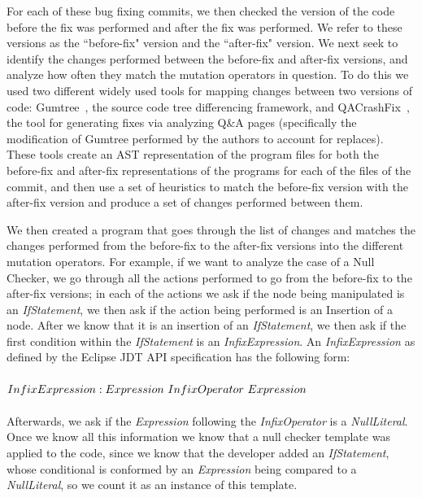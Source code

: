 \documentclass[conference]{IEEEtran}
\begin{document}
For each of these bug fixing commits, we then checked the version of the code 
before the fix was performed and after the fix was performed. We refer to these 
versions as the ``before-fix" version and the ``after-fix" version.
We next seek to identify the changes performed between the before-fix and
after-fix versions, and analyze how often they match the mutation operators in
question. 
%
To do this we used two different widely used tools for mapping changes 
between two versions of code: Gumtree~\cite{falleri14}, the source code tree differencing framework, and QACrashFix~\cite{gao15}, the tool for generating fixes via analyzing Q\&A pages (specifically the modification of Gumtree performed by the authors to account for replaces).
These tools create an AST representation of the program files for both the 
before-fix and after-fix representations of the programs for each of the files 
of the commit, and then use a set of heuristics to match the before-fix version 
with the after-fix version and produce a set of 
changes performed between them. 

We then created a program that goes through the list of changes and matches the
changes performed from the before-fix to the after-fix versions into the
different mutation operators. For example, if we want to analyze the 
case of a Null Checker, we go through all the actions performed to go from the
before-fix to the after-fix versions; in each of the actions we ask if the node
being manipulated is an \emph{IfStatement}, we then  ask if the action being performed
is an Insertion of a node. After we know that it is an insertion of an \emph{IfStatement}, we then ask if the first condition within the \emph{IfStatement} is an
\emph{InfixExpression}. An \emph{InfixExpression} as defined by the Eclipse JDT API
specification has the following form: 
\\
\\
$InfixExpression: \\
Expression~InfixOperator~Expression
$
\\
\\  
Afterwards, we ask if the \emph{Expression} following the \emph{InfixOperator} is a
\emph{NullLiteral}. Once we know all this information we know that a null checker
template was applied to the code, since we know that the developer added an \emph{IfStatement}, whose conditional is conformed by an \emph{Expression} being compared to a
\emph{NullLiteral}, so we count it as an instance of this template. 
\end{document}
